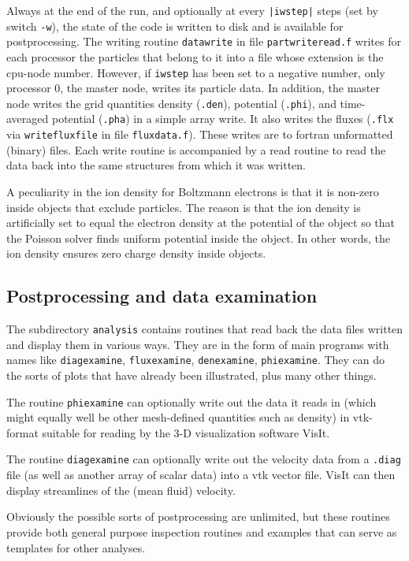 \documentclass[12pt]{article}
\begin{document}
Always at the end of the run, and optionally at every \verb!|iwstep|!
steps (set by switch \verb!-w!), the state of the code is written to
disk and is available for postprocessing. The writing routine
\verb!datawrite! in file \verb!partwriteread.f! writes for each
processor the particles that belong to it into a file whose extension
is the cpu-node number. However, if \verb!iwstep! has been set
to a negative number, only processor 0, the master
node, writes its particle data. In addition, the master node writes
the grid quantities density (\verb!.den!), potential (\verb!.phi!),
and time-averaged potential (\verb!.pha!) in a simple array write. It
also writes the fluxes (\verb!.flx! via \verb!writefluxfile! in file
\verb!fluxdata.f!). These writes are to fortran unformatted (binary)
files. Each write routine is accompanied by a read routine to read the
data back into the same structures from which it was written.

A peculiarity in the ion density for Boltzmann electrons is that it is
non-zero inside objects that exclude particles. The reason is that the
ion density is artificially set to equal the electron density at the 
potential of the object so that the Poisson solver finds uniform
potential inside the object. In other words, the ion density ensures
zero charge density inside objects.

\subsection{Postprocessing and data examination}

The subdirectory \verb!analysis! contains routines that read back the
data files written and display them in various ways. They are in the
form of main programs with names like \verb!diagexamine!,
\verb!fluxexamine!, \verb!denexamine!, \verb!phiexamine!. 
They can do the sorts of plots that have already been illustrated,
plus many other things.

The routine \verb!phiexamine! can optionally write out the data it
reads in (which might equally well be other mesh-defined quantities
such as density) in vtk-format suitable for reading by the 3-D
visualization software VisIt. 

The routine \verb!diagexamine! can optionally write out the velocity
data from a \verb!.diag! file (as well as another array of scalar
data) into a vtk vector file. VisIt can then display streamlines of
the (mean fluid) velocity.

Obviously the possible sorts of postprocessing are unlimited, but
these routines provide both general purpose inspection routines and
examples that can serve as templates for other analyses.
\end{document}
